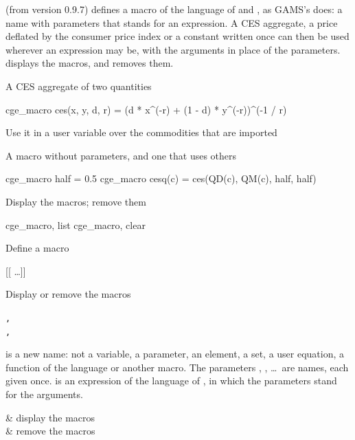 

 (from version 0.9.7) defines a macro of the language of
 and , as GAMS's  does:
a name with parameters that stands for an expression. A CES aggregate, a
price deflated by the consumer price index or a constant written once can then
be used wherever an expression may be, with the arguments in place of the
parameters.  displays the macros, and
 removes them.


A CES aggregate of two quantities
\begin{stcode}
cge_macro ces(x, y, d, r) = (d * x^(-r) + (1 - d) * y^(-r))^(-1 / r)
\end{stcode}
Use it in a user variable over the commodities that are imported
A macro without parameters, and one that uses others
\begin{stcode}
cge_macro half = 0.5
cge_macro cesq(c) = ces(QD(c), QM(c), half, half)
\end{stcode}
Display the macros; remove them
\begin{stcode}
cge_macro, list
cge_macro, clear
\end{stcode}


Define a macro
\begin{stsyntax}
 [\cmd{(}[\cmd{,}  \dots]\cmd{)}] \cmd{=} 
\end{stsyntax}
Display or remove the macros
\begin{stsyntax}
 \texttt{,} \\
 \texttt{,} 
\end{stsyntax}
 is a new name: not a variable, a parameter, an element, a set, a
user equation, a function of the language or another macro. The parameters
, , \dots\ are names, each given once.  is an
expression of the language of , in which the parameters
stand for the arguments.

\begin{opttable}
 & display the macros\\
 & remove the macros\\
\end{opttable}

